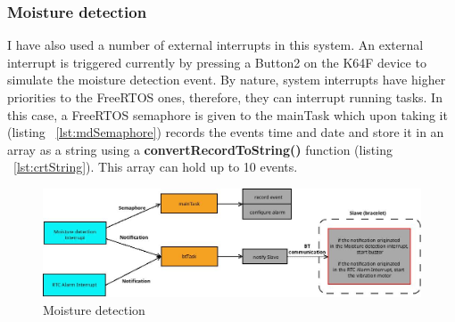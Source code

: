 \documentclass[12pt,a4paper]{article}
\begin{document}
        \subsubsection*{Moisture detection}
        I have also used a number of external interrupts in this system. An external interrupt is triggered currently by pressing a Button2 on the K64F device to simulate the moisture detection event. By nature, system interrupts have higher priorities to the FreeRTOS ones, therefore, they can interrupt running tasks. In this case, a FreeRTOS semaphore is given to the mainTask which upon taking it (listing ~\ref{lst:mdSemaphore}) records the events time and date and store it in an array as a string using a {\bfseries convertRecordToString()} function (listing ~\ref{lst:crtString}). This array can hold up to 10 events.\\
        
        \begin{figure}[h]
         \centering
         \includegraphics[width=\textwidth]{extInt.jpg}
         \caption{Moisture detection}
        \end{figure}
        
\end{document}
